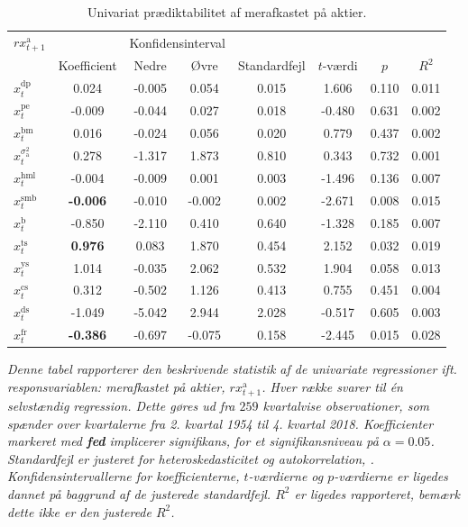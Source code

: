 \documentclass[
  a4paper,
  oneside]{memoir}
\begin{document}
\begin{table}[H]

\caption{\label{tab:UNI-ak}Univariat prædiktabilitet af merafkastet på aktier.}
\centering
\begin{threeparttable}
\begin{tabular}[t]{lccccccc}
\toprule
\multicolumn{1}{c}{$rx_{t+1}^{\text{a}}$} & \multicolumn{1}{c}{ } & \multicolumn{2}{c}{Konfidensinterval} & \multicolumn{4}{c}{ } \\
\cmidrule(l{3pt}r{3pt}){1-1} \cmidrule(l{3pt}r{3pt}){3-4}
  & Koefficient & Nedre & Øvre & Standardfejl & $t$-værdi & $p$ & $R^2$\\
\midrule
\rowcolor{gray!6}  $x_t^{\text{dp}}$ & 0.024 & -0.005 & 0.054 & 0.015 & 1.606 & 0.110 & 0.011\\
$x_t^{\text{pe}}$ & -0.009 & -0.044 & 0.027 & 0.018 & -0.480 & 0.631 & 0.002\\
\rowcolor{gray!6}  $x_t^{\text{bm}}$ & 0.016 & -0.024 & 0.056 & 0.020 & 0.779 & 0.437 & 0.002\\
$x_t^{\sigma_{\text{a}}^2}$ & 0.278 & -1.317 & 1.873 & 0.810 & 0.343 & 0.732 & 0.001\\
\rowcolor{gray!6}  $x_t^{\text{hml}}$ & -0.004 & -0.009 & 0.001 & 0.003 & -1.496 & 0.136 & 0.007\\
$x_t^{\text{smb}}$ & \textbf{-0.006} & -0.010 & -0.002 & 0.002 & -2.671 & 0.008 & 0.015\\
\rowcolor{gray!6}  $x_t^{\text{b}}$ & -0.850 & -2.110 & 0.410 & 0.640 & -1.328 & 0.185 & 0.007\\
$x_t^{\text{ts}}$ & \textbf{ 0.976} & 0.083 & 1.870 & 0.454 & 2.152 & 0.032 & 0.019\\
\rowcolor{gray!6}  $x_t^{\text{ys}}$ & 1.014 & -0.035 & 2.062 & 0.532 & 1.904 & 0.058 & 0.013\\
$x_t^{\text{cs}}$ & 0.312 & -0.502 & 1.126 & 0.413 & 0.755 & 0.451 & 0.004\\
\rowcolor{gray!6}  $x_t^{\text{ds}}$ & -1.049 & -5.042 & 2.944 & 2.028 & -0.517 & 0.605 & 0.003\\
$x_t^{\text{fr}}$ & \textbf{-0.386} & -0.697 & -0.075 & 0.158 & -2.445 & 0.015 & 0.028\\
\bottomrule
\end{tabular}
\begin{tablenotes}
\item \textit{Denne tabel rapporterer den beskrivende statistik af de univariate regressioner ift. responsvariablen: merafkastet på aktier, $rx_{t+1}^{\text{a}}$. Hver række svarer til én selvstændig regression. Dette gøres ud fra $259$ kvartalvise observationer, som spænder over kvartalerne fra 2. kvartal 1954 til 4. kvartal 2018. Koefficienter markeret med \textbf{fed} implicerer signifikans, for et signifikansniveau på $\alpha=0.05$. Standardfejl er justeret for heteroskedasticitet og autokorrelation, \citep{Newey1987}. Konfidensintervallerne for koefficienterne, $t$-værdierne og $p$-værdierne er ligedes dannet på baggrund af de justerede standardfejl. $R^2$ er ligedes rapporteret, bemærk dette ikke er den justerede $R^2$.}
\end{tablenotes}
\end{threeparttable}
\end{table}
\end{document}
